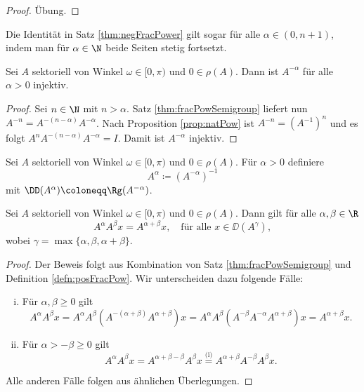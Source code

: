 \begin{proof}
  Übung.
\end{proof}

\begin{kor}
  \label{kor:negFracPower}
  Die Identität in Satz \ref{thm:negFracPower} gilt sogar für alle $\alpha \in (0,n+1)$, indem man für $\alpha \in \N$ beide Seiten stetig fortsetzt.
\end{kor}

\begin{prop}
  Sei $A$ sektoriell von Winkel $\omega \in [0,\pi)$ und $0 \in \rho(A)$.
  Dann ist $A^{-\alpha}$ für alle $\alpha > 0$ injektiv.
\end{prop}

\begin{proof}
  Sei $n \in \N$ mit $n > \alpha$.
  Satz \ref{thm:fracPowSemigroup} liefert nun $A^{-n} = A^{-(n - \alpha)}A^{-\alpha}$.
  Nach Proposition \ref{prop:natPow} ist $A^{-n} = (A^{-1})^n$ und es folgt $A^n A^{-(n - \alpha)} A^{-\alpha} = I$.
  Damit ist $A^{-\alpha}$ injektiv.
\end{proof}

\begin{defn}
  \label{defn:posFracPow}
  Sei $A$ sektoriell von Winkel $\omega \in [0,\pi)$ und $0 \in \rho(A)$.
  Für $\alpha > 0$ definiere 
  $$
  A^\alpha \coloneqq (A^{-\alpha})^{-1}
  $$
  mit $\DD(A^\alpha) \coloneqq \Rg(A^{-\alpha})$.
\end{defn}

\begin{thm}
  Sei $A$ sektoriell von Winkel $\omega \in [0,\pi)$ und $0 \in \rho(A)$.
  Dann gilt für alle $\alpha, \beta \in \R$
  $$
    A^\alpha A^\beta x = A^{\alpha + \beta} x, \quad\text{für alle } x \in \DD(A^\gamma),
  $$
  wobei $\gamma = \max\{\alpha, \beta, \alpha + \beta\}$.
\end{thm}

\begin{proof}
  Der Beweis folgt aus Kombination von Satz \ref{thm:fracPowSemigroup} und Definition \ref{defn:posFracPow}.
  Wir unterscheiden dazu folgende Fälle:
  \begin{enumerate}[(i)]
    \item Für $\alpha, \beta \geq 0$ gilt
  \[
  A^\alpha A^\beta x 
  = A^\alpha A^\beta (A^{-(\alpha + \beta)} A^{\alpha + \beta}) x
  = A^\alpha A^\beta (A^{-\beta} A^{-\alpha} A^{\alpha + \beta} ) x 
  = A^{\alpha + \beta} x. 
  \]
\item Für $\alpha > -\beta \geq 0$ gilt
  \[
    A^\alpha A^\beta x
      = A^{\alpha + \beta - \beta} A^\beta x
      \overset{\text{(i)}}{=} A^{\alpha + \beta} A^{-\beta} A^\beta x.
    \]
  \end{enumerate}
  Alle anderen Fälle folgen aus ähnlichen Überlegungen.
\end{proof}


